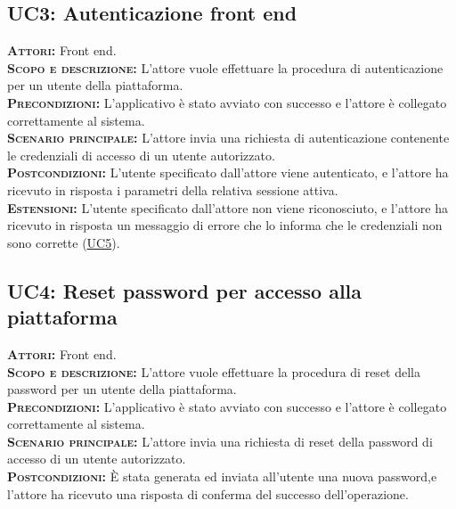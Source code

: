 \subsection{UC3: Autenticazione front end}
\label{sec:uc3}
\textsc{\textbf{Attori:}} Front end.\\
\textsc{\textbf{Scopo e descrizione:}} L'attore vuole effettuare la procedura di autenticazione per un utente della piattaforma.\\
\textsc{\textsc{\textbf{Precondizioni:}}} L'applicativo è stato avviato con successo e l'attore è collegato correttamente al sistema.\\
\textsc{\textbf{Scenario principale:}} L'attore invia una richiesta di autenticazione contenente le credenziali di accesso di un utente autorizzato.\\
\textsc{\textbf{Postcondizioni:}} L'utente specificato dall'attore viene autenticato, e l'attore ha ricevuto in risposta i parametri della relativa sessione attiva.\\
\textsc{\textbf{Estensioni:}}  L'utente specificato dall'attore non viene riconosciuto, e l'attore ha ricevuto in risposta un messaggio di errore che lo informa che le credenziali non sono corrette (\hyperref[sec:UC5]{UC5}).

\subsection{UC4: Reset password per accesso alla piattaforma}
\label{sec:uc4}
\textsc{\textbf{Attori:}} Front end.\\
\textsc{\textbf{Scopo e descrizione:}} L'attore vuole effettuare la procedura di reset della password per un utente della piattaforma.\\
\textsc{\textsc{\textbf{Precondizioni:}}} L'applicativo è stato avviato con successo e l'attore è collegato correttamente al sistema.\\
\textsc{\textbf{Scenario principale:}} L'attore invia una richiesta di reset della password di accesso di un utente autorizzato.\\
\textsc{\textbf{Postcondizioni:}} È stata generata ed inviata all'utente una nuova password,e l'attore ha ricevuto una risposta di conferma del successo dell'operazione.


